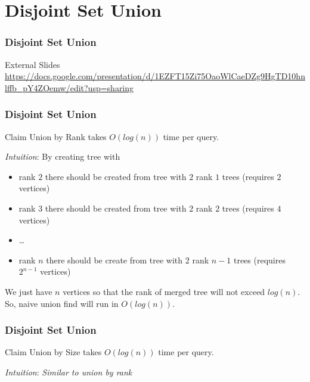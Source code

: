 \section{Disjoint Set Union}

\begin{frame}
\frametitle{Disjoint Set Union}
\begin{block}{External Slides}
\centering
\url{https://docs.google.com/presentation/d/1EZFT15Zi75OaoWlCaeDZg9HgTD10hnlffb_pY4ZOemw/edit?usp=sharing}
\end{block}
\end{frame}

\begin{frame}
\frametitle{Disjoint Set Union}
\begin{block}{Claim}
Union by Rank takes $O(log(n))$ time per query.
\end{block}
\textit{Intuition}:
By creating tree with 
\begin{itemize}
    \item rank $2$ there should be created from tree with $2$ rank $1$ trees (requires $2$ vertices)\\
    \item rank $3$ there should be created from tree with $2$ rank $2$ trees (requires $4$ vertices)\\
    \item \dots
    \item rank $n$ there should be create from tree with $2$ rank $n-1$ trees (requires $2^{n - 1}$ vertices)
\end{itemize}

We just have $n$ vertices so that the rank of merged tree will not exceed $log(n)$. So, naive union find will run in $O(log(n))$.
\end{frame}

\begin{frame}
\frametitle{Disjoint Set Union}
\begin{block}{Claim}
Union by Size takes $O(log(n))$ time per query.
\end{block}
\textit{Intuition}: \textit{Similar to union by rank}
\end{frame}